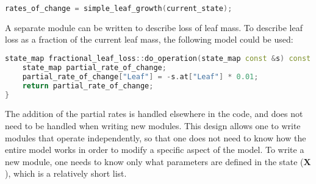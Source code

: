 \documentclass{article}
\newcommand{\boldX}{\mathbf{X}}
\begin{document}
\begin{center}
\begin{lstlisting}[language=c++]
rates_of_change = simple_leaf_growth(current_state);  
\end{lstlisting}
\end{center}


A separate module can be written to describe loss of leaf mass. To describe leaf loss as a fraction of the current leaf mass, the following model could be used:

\begin{center}
\begin{lstlisting}[language=c++]
state_map fractional_leaf_loss::do_operation(state_map const &s) const
    state_map partial_rate_of_change;
    partial_rate_of_change["Leaf"] = -s.at["Leaf"] * 0.01;
    return partial_rate_of_change;    
}
\end{lstlisting}
\end{center}

The addition of the partial rates is handled elsewhere in the code, and does not need to be handled when writing new modules. This design allows one to write modules that operate independently, so that one does not need to know how the entire model works in order to modify a specific aspect of the model. To write a new module, one needs to know only what parameters are defined in the state ($\boldX$), which is a relatively short list.
\end{document}
